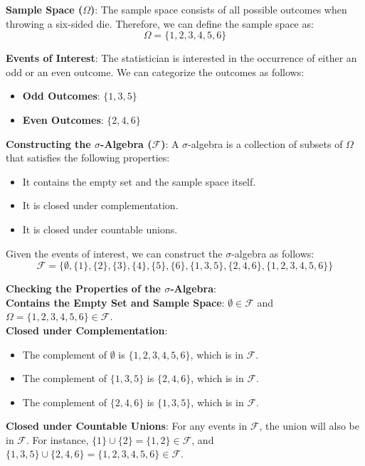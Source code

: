 \begin{solution}
    \textbf{Sample Space (\(\Omega\))}:  The sample space consists of all possible outcomes when throwing a six-sided die. Therefore, we can define the sample space as:
\[
\Omega = \{1, 2, 3, 4, 5, 6\}
\]

\textbf{Events of Interest}:  The statistician is interested in the occurrence of either an odd or an even outcome. We can categorize the outcomes as follows:
\begin{itemize}
    \item \textbf{Odd Outcomes}: \( \{1, 3, 5\} \)
    \item \textbf{Even Outcomes}: \( \{2, 4, 6\} \)
\end{itemize}

\textbf{Constructing the \(\sigma\)-Algebra (\(\mathcal{F}\))}: A \(\sigma\)-algebra is a collection of subsets of \(\Omega\) that satisfies the following properties:
\begin{itemize}
    \item It contains the empty set and the sample space itself.
    \item It is closed under complementation.
    \item It is closed under countable unions.
\end{itemize}

Given the events of interest, we can construct the \(\sigma\)-algebra as follows:
\[
\mathcal{F} = \{ \emptyset, \{1\}, \{2\}, \{3\}, \{4\}, \{5\}, \{6\}, \{1, 3, 5\}, \{2, 4, 6\}, \{1, 2, 3, 4, 5, 6\} \}
\]

\textbf{Checking the Properties of the \(\sigma\)-Algebra}:\\

 \textbf{Contains the Empty Set and Sample Space}: \(\emptyset \in \mathcal{F}\) and \(\Omega = \{1, 2, 3, 4, 5, 6\} \in \mathcal{F}\).\\
    
\textbf{Closed under Complementation}: 
    \begin{itemize}
        \item The complement of \(\emptyset\) is \(\{1, 2, 3, 4, 5, 6\}\), which is in \(\mathcal{F}\).
        \item The complement of \(\{1, 3, 5\}\) is \(\{2, 4, 6\}\), which is in \(\mathcal{F}\).
        \item The complement of \(\{2, 4, 6\}\) is \(\{1, 3, 5\}\), which is in \(\mathcal{F}\).
    \end{itemize}
    
\textbf{Closed under Countable Unions}: For any events in \(\mathcal{F}\), the union will also be in \(\mathcal{F}\). For instance, 
    \(\{1\} \cup \{2\} = \{1, 2\} \in \mathcal{F}\), and 
    \(\{1, 3, 5\} \cup \{2, 4, 6\} = \{1, 2, 3, 4, 5, 6\} \in \mathcal{F}\).\\
\end{solution}

